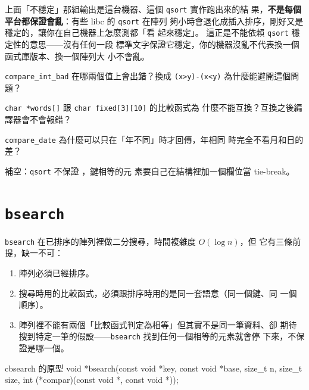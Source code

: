 上面「不穩定」那組輸出是這台機器、這個 \texttt{qsort} 實作跑出來的結
果，\textbf{不是每個平台都保證會亂}：有些 libc 的 \texttt{qsort} 在陣列
夠小時會退化成插入排序，剛好又是穩定的，讓你在自己機器上怎麼測都「看
起來穩定」。 這正是不能依賴 \texttt{qsort} 穩定性的意思——沒有任何一段
標準文字保證它穩定，你的機器沒亂不代表換一個函式庫版本、換一個陣列大
小不會亂。


\begin{drills}[label=drills:sl-qsort]
\item \texttt{compare\_int\_bad} 在哪兩個值上會出錯？換成
\texttt{(x>y)-(x<y)} 為什麼能避開這個問題？
\item \texttt{char *words[]} 跟 \texttt{char fixed[3][10]} 的比較函式為
什麼不能互換？互換之後編譯器會不會報錯？
\item \texttt{compare\_date} 為什麼可以只在「年不同」時才回傳，年相同
時完全不看月和日的差？
\item 補空：\texttt{qsort} 不保證 \underline{\hspace{2em}}，鍵相等的元
素要自己在結構裡加一個欄位當 tie-break。
\end{drills}

\section{\texttt{bsearch}}
\label{sec:sl-bsearch}

\texttt{bsearch} 在已排序的陣列裡做二分搜尋，時間複雜度 $O(\log n)$，但
它有三條前提，缺一不可：

\begin{enumerate}
\item 陣列必須已經排序。
\item 搜尋時用的比較函式，必須跟排序時用的是同一套語意（同一個鍵、同
一個順序）。
\item 陣列裡不能有兩個「比較函式判定為相等」但其實不是同一筆資料、卻
期待搜到特定一筆的假設——\texttt{bsearch} 找到任何一個相等的元素就會停
下來，不保證是哪一個。
\end{enumerate}

\begin{code}{c}{bsearch 的原型}
void *bsearch(const void *key, const void *base, size_t n, size_t size,
              int (*compar)(const void *, const void *));
\end{code}

